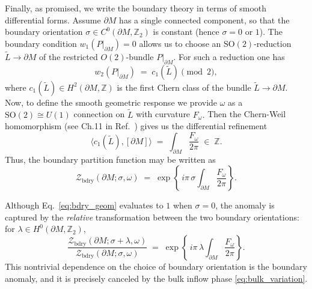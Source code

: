 \documentclass[aps,prx,reprint,superscriptaddress,twocolumn,amsmath,amssymb,amsfonts, nofootinbib]{revtex4-2}
\newcommand{\SO}{\text{SO}}
\newcommand{\Z}{\mathbb{Z}}
\theoremstyle{apsstyle}
\begin{document}
Finally, as promised, we write the boundary theory in terms of smooth differential forms.  Assume $\partial M$ has a single connected component, so that the boundary orientation $\sigma\in C^{0}(\partial M,\Z_{2})$ is constant (hence $\sigma=0$ or $1$).  The boundary condition $w_{1}(P|_{\partial M})=0$ allows us to choose an $\SO(2)$-reduction $\widetilde L\to \partial M$ of the restricted $O(2)$-bundle
$P|_{\partial M}$.  For such a reduction one has 
\begin{equation*}
  w_{2}(P|_{\partial M}) \;=\; c_{1}(\widetilde L)   \pmod 2,
\end{equation*}
where $c_{1}(\widetilde L)\in H^{2}(\partial M, \Z)$ is the first Chern class of the bundle $\widetilde L \to \partial M$. Now, to define the smooth geometric response we provide $\omega$ as a $\SO(2)\cong U(1)$ connection on $\widetilde L$ with curvature $F_{\omega}.$ Then the Chern-Weil homomorphism (see Ch.11 in Ref.~\cite{Nakahara2018}) gives us the differential refinement
\begin{equation}
\label{eq:ChernWeil}
  \big\langle c_{1}(\widetilde L),[\partial M]\big\rangle
  \;=\;
  \int_{\partial M}\frac{F_{\omega}}{2\pi}
  \;\in\;\Z.
\end{equation}
Thus, the boundary partition function may be written as 
\begin{equation}
\label{eq:bdry_geom}
  \mathcal Z_{\mathrm{bdry}}(\partial M;\sigma,\omega)
  \;=\;
  \exp \left\{\, i\pi\,\sigma  \int_{\partial M}\frac{F_{\omega}}{2\pi}\right\}.
\end{equation} 

Although Eq.~\ref{eq:bdry_geom} evaluates to $1$ when $\sigma=0$, the anomaly is captured by the \emph{relative} transformation between the two boundary orientations: for $\lambda\in H^{0}(\partial M,\Z_{2})$,
\begin{equation}
  \frac{\mathcal Z_{\mathrm{bdry}}(\partial M;\sigma+\lambda,\omega)}
       {\mathcal Z_{\mathrm{bdry}}(\partial M;\sigma,\omega)}
  \;=\;
  \exp \left\{\, i\pi\,\lambda  \int_{\partial M}\frac{F_{\omega}}{2\pi}\right\}.
  \label{eq:bdry_geom_variation}
\end{equation}
This nontrivial dependence on the choice of boundary orientation is the
boundary anomaly, and it is precisely canceled by the bulk inflow phase
\eqref{eq:bulk_variation}.

\bigskip 
\end{document}
